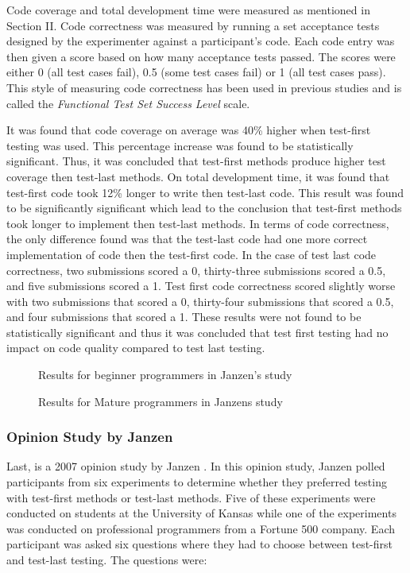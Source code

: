 \documentclass{sig-alternate}
\begin{document}
Code coverage and total development time were measured as mentioned in Section II.  Code correctness was measured by running a set acceptance tests designed by the experimenter against a participant's code. Each code entry was then given a score based on how many acceptance tests passed.  The scores were either 0 (all test cases fail), 0.5 (some test cases fail) or 1 (all test cases pass).  This style of measuring code correctness has been used in previous studies and is called the \textit{Functional Test Set Success Level} scale.

It was found that code coverage on average was 40\% higher when test-first testing was used.  This percentage increase was found to be statistically significant. Thus, it was concluded that test-first methods produce higher test coverage then test-last methods. On total development time, it was found that test-first code took 12\% longer to write then test-last code.  This result was found to be significantly significant which lead to the conclusion that test-first methods took longer to implement then test-last methods. In terms of code correctness, the only difference found was that the test-last code had one more correct implementation of code then the test-first code.  In the case of test last code correctness, two submissions scored a 0, thirty-three submissions scored a 0.5, and five submissions scored a 1.  Test first code correctness scored slightly worse with two submissions that scored a 0, thirty-four submissions that scored a 0.5, and four submissions that scored a 1.  These results were not found to be statistically significant and thus it was concluded that test first testing had no impact on code quality compared to test last testing.

\begin{figure}
\centering
{}
\caption{Results for beginner programmers in Janzen's study}
\end{figure}

\begin{figure}
\centering
{}
\caption{Results for Mature programmers in Janzens study}
\end{figure}

\subsubsection{Opinion Study by Janzen}

Last, is a 2007 opinion study by Janzen \cite{Janzen:2007}.  In this opinion study, Janzen polled participants from six experiments to determine whether they preferred testing with test-first methods or test-last methods.  Five of these experiments were conducted on students at the University of Kansas while one of the experiments was conducted on professional programmers from a Fortune 500 company.   Each participant was asked six questions where they had to choose between test-first and test-last testing.  The questions were:
\end{document}
